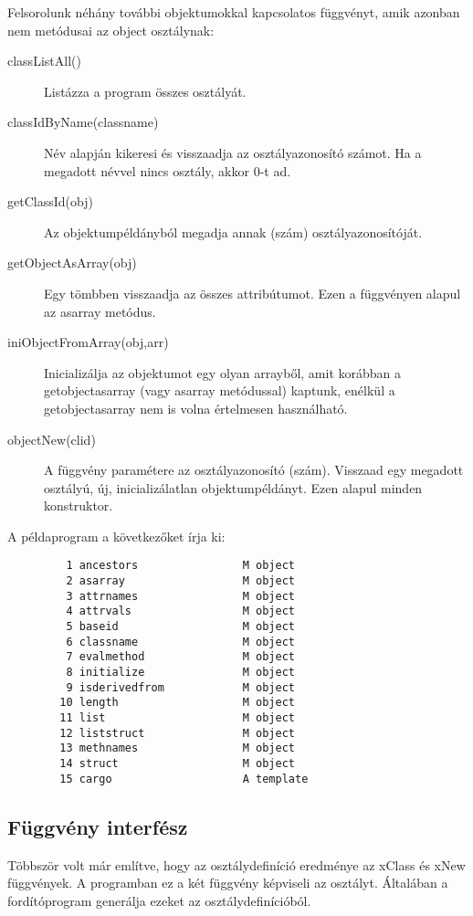 Felsorolunk néhány további objektumokkal kapcsolatos
függvényt, amik azonban nem metódusai az object osztálynak:
\begin{description}
\item[classListAll()]
    Listázza a program összes osztályát.
\item[classIdByName(classname)]
    Név alapján kikeresi és visszaadja az osztályazonosító számot.
    Ha a megadott névvel nincs osztály, akkor 0-t ad.
\item[getClassId(obj)]
    Az objektumpéldányból megadja annak (szám) osztályazonosítóját.
\item[getObjectAsArray(obj)]
    Egy tömbben visszaadja az összes attribútumot.
    Ezen a függvényen alapul az asarray metódus.
\item[iniObjectFromArray(obj,arr)]
    Inicializálja az objektumot egy olyan arrayből,
    amit korábban a getobjectasarray (vagy asarray metódussal) 
    kaptunk, enélkül a getobjectasarray nem is volna értelmesen 
    használható. 
\item[objectNew(clid)]
    A függvény paramétere az osztályazonosító (szám).
    Visszaad egy megadott osztályú, új, inicializálatlan 
    objektumpéldányt. Ezen alapul minden konstruktor.
\end{description}

A példaprogram a következőket írja ki:
\begin{verbatim}
         1 ancestors                M object
         2 asarray                  M object
         3 attrnames                M object
         4 attrvals                 M object
         5 baseid                   M object
         6 classname                M object
         7 evalmethod               M object
         8 initialize               M object
         9 isderivedfrom            M object
        10 length                   M object
        11 list                     M object
        12 liststruct               M object
        13 methnames                M object
        14 struct                   M object
        15 cargo                    A template
\end{verbatim}

\subsection{Függvény interfész}

Többször volt már említve, hogy az osztálydefiníció eredménye
az xClass és xNew függvények. A programban ez a két függvény
képviseli az osztályt. Általában a fordítóprogram generálja ezeket
az osztálydefinícióból.


